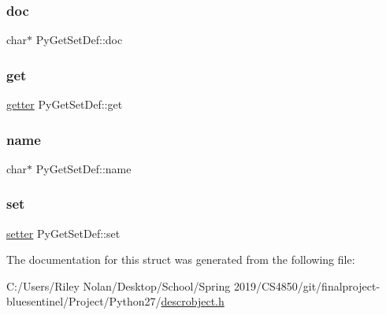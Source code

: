\subsubsection{\texorpdfstring{doc}{doc}}
{\footnotesize\ttfamily char$\ast$ Py\+Get\+Set\+Def\+::doc}

\mbox{\label{struct_py_get_set_def_a88b9bd1a9bde46a5bd261e03927219fa}} 
\subsubsection{\texorpdfstring{get}{get}}
{\footnotesize\ttfamily \mbox{\hyperlink{descrobject_8h_ac44beb2d92298f4cdf6b605b6d9ecb25}{getter}} Py\+Get\+Set\+Def\+::get}

\mbox{\label{struct_py_get_set_def_a30046cd8a0375471ba84475c49feea5b}} 
\subsubsection{\texorpdfstring{name}{name}}
{\footnotesize\ttfamily char$\ast$ Py\+Get\+Set\+Def\+::name}

\mbox{\label{struct_py_get_set_def_ae8d938614fa25c86819f06926e28e353}} 
\subsubsection{\texorpdfstring{set}{set}}
{\footnotesize\ttfamily \mbox{\hyperlink{descrobject_8h_a92c8202514fe030a3d6b691da347af29}{setter}} Py\+Get\+Set\+Def\+::set}



The documentation for this struct was generated from the following file\+:\begin{DoxyCompactItemize}
\item 
C\+:/\+Users/\+Riley Nolan/\+Desktop/\+School/\+Spring 2019/\+C\+S4850/git/finalproject-\/bluesentinel/\+Project/\+Python27/\mbox{\hyperlink{descrobject_8h}{descrobject.\+h}}\end{DoxyCompactItemize}
